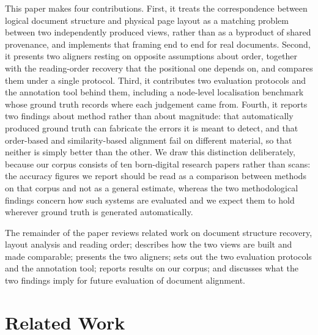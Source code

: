 \documentclass[11pt,twoside]{article}
\begin{document}
This paper makes four contributions. First, it treats the correspondence between logical document structure and physical page layout as a matching problem between two independently produced views, rather than as a byproduct of shared provenance, and implements that framing end to end for real documents. Second, it presents two aligners resting on opposite assumptions about order, together with the reading-order recovery that the positional one depends on, and compares them under a single protocol. Third, it contributes two evaluation protocols and the annotation tool behind them, including a node-level localisation benchmark whose ground truth records where each judgement came from. Fourth, it reports two findings about method rather than about magnitude: that automatically produced ground truth can fabricate the errors it is meant to detect, and that order-based and similarity-based alignment fail on different material, so that neither is simply better than the other. We draw this distinction deliberately, because our corpus consists of ten born-digital research papers rather than scans: the accuracy figures we report should be read as a comparison between methods on that corpus and not as a general estimate, whereas the two methodological findings concern how such systems are evaluated and we expect them to hold wherever ground truth is generated automatically.


The remainder of the paper reviews related work on document structure recovery, layout analysis and reading order; describes how the two views are built and made comparable; presents the two aligners; sets out the two evaluation protocols and the annotation tool; reports results on our corpus; and discusses what the two findings imply for future evaluation of document alignment.

\section{Related Work}
\label{sec:related}
\end{document}
